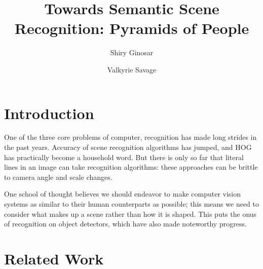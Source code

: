 \documentclass[11pt]{article}
\begin{document}
\title{Towards Semantic Scene Recognition: Pyramids of People}
\author{Shiry Ginosar \and Valkyrie Savage}

\maketitle


\section{Introduction}
One of the three core problems of computer, recognition has made long strides in the past years.  Accuracy of scene recognition algorithms has jumped, and HOG has practically become a household word.  But there is only so far that literal lines in an image can take recognition algorithms: these approaches can be brittle to camera angle and scale changes.

One school of thought believes we should endeavor to make computer vision systems as similar to their human counterparts as possible; this means we need to consider what makes up a scene rather than how it is shaped.  This puts the onus of recognition on object detectors, which have also made noteworthy progress.

\section{Related Work}
\end{document}
